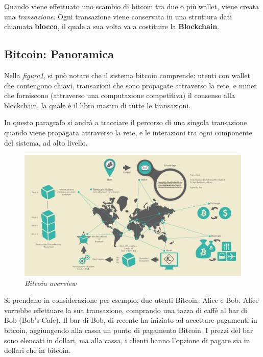 Quando viene effettuato uno scambio di bitcoin tra due o più wallet, viene creata una \textit{transazione}. Ogni transazione viene conservata in una struttura dati chiamata \textbf{blocco}, il quale a sua volta va a costituire la \textbf{Blockchain}.

\subsection{Bitcoin: Panoramica}

Nella \textit{figura\ref{fig:overview}}, si può notare che il sistema bitcoin comprende: utenti con wallet che contengono chiavi, transazioni che sono propagate attraverso la rete, e miner che forniscono (attraverso una computazione competitiva) il consenso alla blockchain, la quale è il libro mastro di tutte le transazioni.

In questo paragrafo si andrà a tracciare il percorso di una singola transazione quando viene propagata attraverso la rete, e le interazioni tra ogni componente del sistema, ad alto livello.

\begin{figure}[h]
	\centering
	\includegraphics[width= \linewidth]{figure/overview}
	\caption{\textit{Bitcoin overview} \label{fig:overview}}
\end{figure}

Si prendano in considerazione per esempio, due utenti Bitcoin: Alice e Bob. Alice vorrebbe effettuare la sua transazione, comprando una tazza di caffè al bar di Bob (Bob's Cafe). Il bar di Bob, di recente ha iniziato ad accettare pagamenti in bitcoin, aggiungendo alla cassa un punto di pagamento Bitcoin. I prezzi del bar sono elencati in dollari, ma alla cassa, i clienti hanno l'opzione di pagare sia in dollari che in bitcoin.

